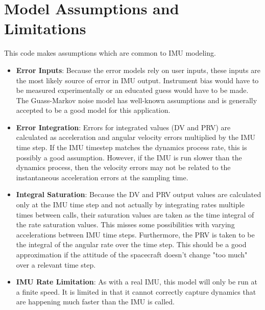 \section{Model Assumptions and Limitations}
This code makes assumptions which are common to IMU modeling.
\begin{itemize}
	\item \textbf{Error Inputs}: Because the error models rely on user inputs, these inputs are the most likely source of error in IMU output. Instrument bias would have to be measured experimentally or an educated guess would have to be made. The Guass-Markov noise model has well-known assumptions and is generally accepted to be a good model for this application.
	\item \textbf{Error Integration}: Errors for integrated values (DV and PRV) are calculated as acceleration and angular velocity errors multiplied by the IMU time step.  If the IMU timestep matches the dynamics process rate, this is possibly a good assumption. However, if the IMU is run slower than the dynamics process, then the velocity errors may not be related to the instantaneous acceleration errors at the sampling time.
	
	\item \textbf{Integral Saturation}: Because the DV and PRV output values are calculated only at the IMU time step and not actually by integrating rates multiple times between calls, their saturation values are taken as the time integral of the rate saturation values. This misses some possibilities with varying accelerations between IMU time steps. Furthermore, the PRV is taken to be the integral of the angular rate over the time step. This should be a good approximation if the attitude of the spacecraft doesn't change "too much" over a relevant time step.
	
	\item \textbf{IMU Rate Limitation}: As with a real IMU, this model will only be run at a finite speed. It is limited in that it cannot correctly capture dynamics that are happening much faster than the IMU is called. 
\end{itemize}